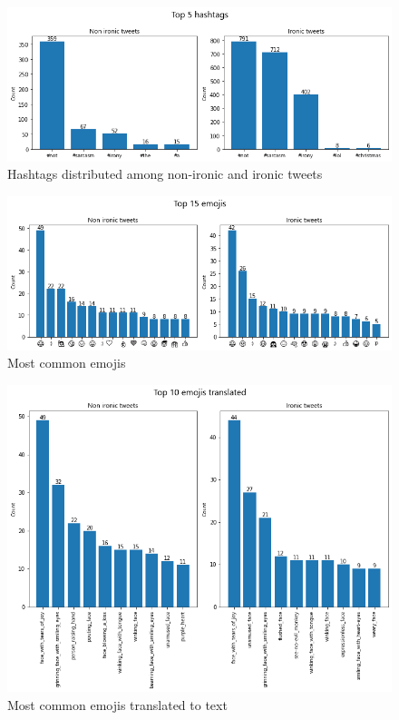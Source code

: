 \documentclass[11pt]{article}
\begin{document}
\begin{figure}[h!]
  \includegraphics[width=\columnwidth]{hashtags}
  \caption{Hashtags distributed among non-ironic and ironic tweets}\label{fig:figure9}
\end{figure}

\begin{figure}[h!]
  \includegraphics[width=\columnwidth]{emojis}
  \caption{Most common emojis}\label{fig:figure15}
\end{figure}

\begin{figure}[h!]
  \includegraphics[width=\columnwidth]{emojis2}
  \caption{Most common emojis translated to text}\label{fig:figure14}
\end{figure}
\end{document}

